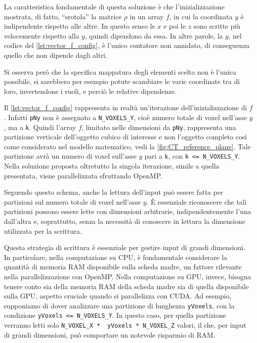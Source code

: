 \documentclass[12pt,a4paper]{report}
\begin{document}
La caratteristica fondamentale di questa soluzione è che l'inizializzazione mostrata, di fatto, ``srotola'' la matrice
\(\rho\) in un array \(f\), in cui la coordinata \(y\) è indipendente rispetto alle altre.
In questo senso le \(x\) e poi le \(z\) sono scritte più velocemente rispetto alla \(y\), quindi dipendono da essa.
In altre parole, la \(y\), nel codice del \autoref{lst:vector_f_config}, è l'unico contatore non annidato, di conseguenza quello
che non dipende dagli altri.

Si osserva però che la specifica mappatura degli elementi scelta non è l'unica possibile, si sarebbero per esempio potute
scambiare le varie coordinate tra di loro, invertendone i ruoli, e perciò le relative dipendenze.

Il \autoref{lst:vector_f_config} rappresenta in realtà un'iterazione dell'inizializzazione di \(f\).
Infatti \lstinline{pNy} non è assegnato a \mbox{\lstinline{N_VOXELS_Y},} cioè numero totale di voxel nell'asse \(y\), ma a
\mbox{\lstinline{k}.}
Quindi l'array \(f\), limitato nelle dimensioni da \mbox{\lstinline{pNy},} rappresenta una partizione verticale dell'oggetto
cubico di interesse e non l'oggetto completo così come considerato nel modello matematico, vedi la
\autoref{fig:CT_reference_plane}.
Tale partizione avrà un numero di voxel sull'asse \(y\) pari a \mbox{\lstinline{k},} con \mbox{\lstinline{k <= N_VOXELS_Y}.}
Nella soluzione proposta oltretutto la singola iterazione, simile a quella presentata, viene parallelizzata sfruttando OpenMP.

Seguendo questo schema, anche la lettura dell'input può essere fatta per partizioni sul numero totale di voxel nell'asse \(y\).
È essenziale riconoscere che tali partizioni possono essere lette con dimensioni arbitrarie, indipendentemente l'una dall'altra e,
soprattutto, senza la necessità di conoscere in lettura la dimensione utilizzata per la scrittura.

Questa strategia di scrittura è essenziale per gestire input di grandi dimensioni.
In particolare, nella computazione su CPU, è fondamentale considerare la quantità di memoria RAM disponibile sulla scheda madre,
un fattore rilevante nella parallelizzazione con OpenMP.
Nella computazione su GPU, invece, bisogna tenere conto sia della memoria RAM della scheda madre sia di quella disponibile sulla
GPU, aspetto cruciale quando si parallelizza con CUDA.
Ad esempio, supponiamo di dover analizzare una partizione di lunghezza \mbox{\lstinline{yVoxels},} con la condizione
\mbox{\lstinline{yVoxels <= N_VOXELS_Y}.}
In questo caso, per quella partizione verranno letti solo \lstinline{N_VOXEL_X *  yVoxels * N_VOXEL_Z} valori, il che, per input
di grandi dimensioni, può comportare un notevole risparmio di RAM.
\end{document}
